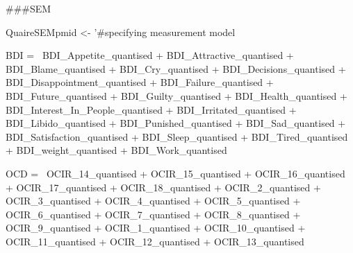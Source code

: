 \documentclass[]{article}
\newenvironment{Shaded}{\begin{snugshade}}{\end{snugshade}}
\newcommand{\StringTok}[1]{\textcolor[rgb]{0.31,0.60,0.02}{#1}}
\newcommand{\NormalTok}[1]{#1}
\begin{document}
\begin{Shaded}
\begin{Highlighting}[]
\NormalTok{###SEM}

\NormalTok{QuaireSEMpmid <-}\StringTok{ '#specifying measurement model}

\StringTok{BDI =~ BDI_Appetite_quantised   + }
\StringTok{       BDI_Attractive_quantised + }
\StringTok{       BDI_Blame_quantised  + }
\StringTok{       BDI_Cry_quantised    +   }
\StringTok{       BDI_Decisions_quantised  +   }
\StringTok{       BDI_Disappointment_quantised +   }
\StringTok{       BDI_Failure_quantised    +   }
\StringTok{       BDI_Future_quantised +   }
\StringTok{       BDI_Guilty_quantised +   }
\StringTok{       BDI_Health_quantised +   }
\StringTok{       BDI_Interest_In_People_quantised +   }
\StringTok{       BDI_Irritated_quantised  +   }
\StringTok{       BDI_Libido_quantised +   }
\StringTok{       BDI_Punished_quantised   +   }
\StringTok{       BDI_Sad_quantised + }
\StringTok{       BDI_Satisfaction_quantised   +   }
\StringTok{       BDI_Sleep_quantised  +   }
\StringTok{       BDI_Tired_quantised  +   }
\StringTok{       BDI_weight_quantised +   }
\StringTok{       BDI_Work_quantised   }

\StringTok{OCD =~ OCIR_14_quantised    +   }
\StringTok{       OCIR_15_quantised    +   }
\StringTok{       OCIR_16_quantised    +   }
\StringTok{       OCIR_17_quantised    +   }
\StringTok{       OCIR_18_quantised    +   }
\StringTok{       OCIR_2_quantised +   }
\StringTok{       OCIR_3_quantised +   }
\StringTok{       OCIR_4_quantised +   }
\StringTok{       OCIR_5_quantised +   }
\StringTok{       OCIR_6_quantised +   }
\StringTok{       OCIR_7_quantised +   }
\StringTok{       OCIR_8_quantised +   }
\StringTok{       OCIR_9_quantised +   }
\StringTok{       OCIR_1_quantised +   }
\StringTok{       OCIR_10_quantised    +   }
\StringTok{       OCIR_11_quantised    +   }
\StringTok{       OCIR_12_quantised    +   }
\StringTok{       OCIR_13_quantised}


\end{Highlighting}
\end{Shaded}
\end{document}
